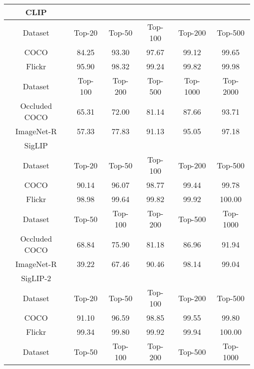 \begin{table*}[h]
    \centering
    \tabcolsep=0.25cm
    \begin{tabular}{cccccc}
    
    
\toprule
 CLIP & & & & & \\
\midrule 
Dataset & Top-20 & Top-50 & Top-100 & Top-200 & Top-500 \\

COCO & 84.25 & 93.30 & 97.67 & 99.12 & 99.65 \\
Flickr & 95.90 & 98.32 & 99.24 & 99.82 & 99.98 \\

\midrule

Dataset & Top-100 & Top-200 & Top-500 & Top-1000 & Top-2000 \\

Occluded COCO & 65.31 & 72.00 & 81.14 & 87.66 & 93.71 \\
ImageNet-R & 57.33 & 77.83 & 91.13 & 95.05 & 97.18 \\

\bottomrule



\toprule
 SigLIP & & & & & \\
\midrule 
Dataset & Top-20 & Top-50 & Top-100 & Top-200 & Top-500 \\

COCO & 90.14 & 96.07 & 98.77 & 99.44 & 99.78 \\
Flickr & 98.98 & 99.64 & 99.82 & 99.92 & 100.00 \\

\midrule

Dataset & Top-50 & Top-100 & Top-200 & Top-500 & Top-1000 \\

Occluded COCO & 68.84 & 75.90 & 81.18 & 86.96 & 91.94 \\
ImageNet-R & 39.22 & 67.46 & 90.46 & 98.14 & 99.04 \\

\bottomrule


\toprule
 SigLIP-2 & & & & & \\
\midrule 
Dataset & Top-20 & Top-50 & Top-100 & Top-200 & Top-500 \\

COCO & 91.10 & 96.59 & 98.85 & 99.55 & 99.80 \\
Flickr & 99.34 & 99.80 & 99.92 & 99.94 & 100.00 \\

\midrule

Dataset & Top-50 & Top-100 & Top-200 & Top-500 & Top-1000 \\


\end{tabular}
\end{table*}
